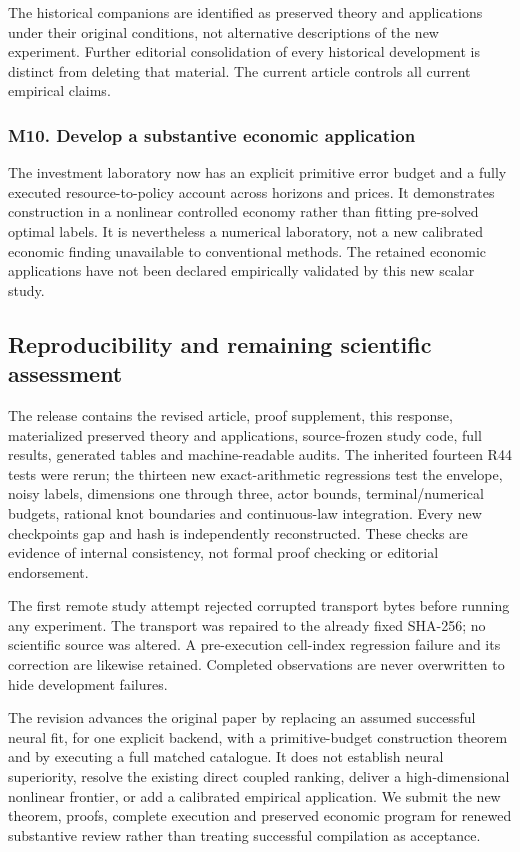 \documentclass[ecta,nameyear,draft]{econsocart}
\begin{document}
The historical companions are identified as preserved theory and
applications under their original conditions, not alternative
descriptions of the new experiment. Further editorial consolidation of
every historical development is distinct from deleting that material.
The current article controls all current empirical claims.

\hypertarget{m10-develop-a-substantive-economic-application}{%
\subsubsection{M10. Develop a substantive economic
application}\label{m10-develop-a-substantive-economic-application}}

The investment laboratory now has an explicit primitive error budget and
a fully executed resource-to-policy account across horizons and prices.
It demonstrates construction in a nonlinear controlled economy rather
than fitting pre-solved optimal labels. It is nevertheless a numerical
laboratory, not a new calibrated economic finding unavailable to
conventional methods. The retained economic applications have not been
declared empirically validated by this new scalar study.

\hypertarget{reproducibility-and-remaining-scientific-assessment}{%
\subsection{Reproducibility and remaining scientific
assessment}\label{reproducibility-and-remaining-scientific-assessment}}

The release contains the revised article, proof supplement, this
response, materialized preserved theory and applications, source-frozen
study code, full results, generated tables and machine-readable audits.
The inherited fourteen R44 tests were rerun; the thirteen new
exact-arithmetic regressions test the envelope, noisy labels, dimensions
one through three, actor bounds, terminal/numerical budgets, rational
knot boundaries and continuous-law integration. Every new
checkpoint\textquotesingle s gap and hash is independently
reconstructed. These checks are evidence of internal consistency, not
formal proof checking or editorial endorsement.

The first remote study attempt rejected corrupted transport bytes before
running any experiment. The transport was repaired to the already fixed
SHA-256; no scientific source was altered. A pre-execution cell-index
regression failure and its correction are likewise retained. Completed
observations are never overwritten to hide development failures.

The revision advances the original paper by replacing an assumed
successful neural fit, for one explicit backend, with a primitive-budget
construction theorem and by executing a full matched catalogue. It does
not establish neural superiority, resolve the existing direct coupled
ranking, deliver a high-dimensional nonlinear frontier, or add a
calibrated empirical application. We submit the new theorem, proofs,
complete execution and preserved economic program for renewed
substantive review rather than treating successful compilation as
acceptance.
\end{document}
